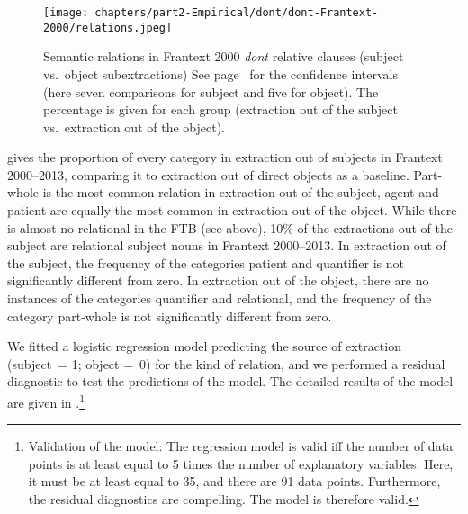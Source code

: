 \begin{figure}
        \centering
        \texttt{[image: chapters/part2-Empirical/dont/dont-Frantext-2000/relations.jpeg]}
        \caption{Semantic relations in Frantext 2000 \emph{dont} relative clauses (subject vs.\ object subextractions) See page~\pageref{ch:conf-intervals-binomial} for the confidence intervals (here seven comparisons for subject and five for object). The percentage is given for each group (extraction out of the subject vs.\ extraction out of the object).}
        \label{fig:dont-d2000-relations}
\end{figure}

 gives the proportion of every category in extraction out of subjects in Frantext 2000--2013, comparing it to extraction out of direct objects as a baseline. 
Part-whole is the most common relation in extraction out of the subject, agent and patient are equally the most common in extraction out of the object. 
While there is almost no relational in the FTB (see above), 10\% of the extractions out of the subject are relational subject nouns in Frantext 2000--2013. 
In extraction out of the subject, the frequency of the categories patient and quantifier is not significantly different from zero. 
In extraction out of the object, there are no instances of the categories quantifier and relational, and the frequency of the category part-whole is not significantly different from zero.

We fitted a logistic regression model predicting the source of extraction (subject~= 1; object =~0) for the kind of relation, and we performed a residual diagnostic to test the predictions of the model. The detailed results of the model are given in .\footnote{Validation of the model: The regression model is valid iff the number of data points is at least equal to 5 times the number of explanatory variables. Here, it must be at least equal to 35, and there are 91 data points. Furthermore, the residual diagnostics are compelling. The model is therefore valid.} 

